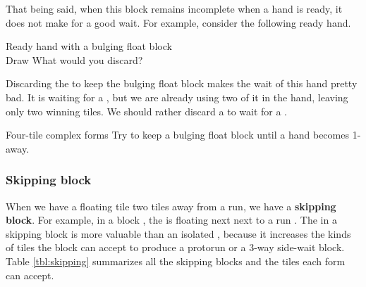 \bigskip
That being said, when this block remains incomplete when a hand is ready, it does not make for a good wait. For example, consider the following ready hand. 
\begin{itembox}[r]{Ready hand with a bulging float block}
\bp
{}\bei\zhong\zhong\zhong~\\
\hspace{290pt}\footnotesize{Draw}
\ep 
\vspace{-15pt}What would you discard? \vspace{-5pt}
\end{itembox}
\noindent
Discarding the {\large\bei} to keep the bulging float block {\large{}} makes the wait of this hand pretty bad. It is waiting for a {\large{}}, but we are already using two of it in the hand, leaving only two winning tiles. We should rather discard a {\large{}} to wait for a {\large\bei}. 


\begin{itembox}[c]{Four-tile complex forms}
Try to keep a bulging float block until a hand becomes 1-away.
\end{itembox}

\subsubsection{Skipping block}
When we have a floating tile two tiles away from a run, we have a {\bf skipping block}. For example, in a block {\large{}}, the {\large{}} is floating next next to a run {\large{}}. The {\large{}} in a skipping block is more valuable than an isolated {\large{}}, because it increases the kinds of tiles the block can accept to produce a protorun or a 3-way side-wait block. Table \ref{tbl:skipping} summarizes all the skipping blocks and the tiles each form can accept. 

